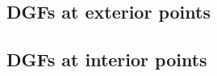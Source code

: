 \documentclass[letterpaper]{article}
\begin{document}
\subsection*{DGFs at exterior points}
%
%
%
\subsection*{DGFs at interior points}
%
%
%
%
%
\end{document}
